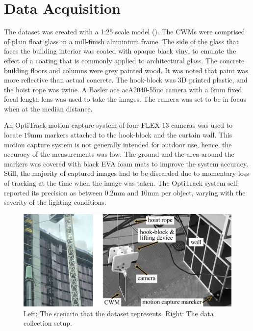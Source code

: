 \section*{Data Acquisition}
The dataset was created with a 1:25 scale model (). The CWMs were comprised of plain float glass in a mill-finish aluminium frame. The side of the glass that faces the building interior was coated with opaque black vinyl to emulate the effect of a coating that is commonly applied to architectural glass. The concrete building floors and columns were grey painted wood. It was noted that paint was more reflective than actual concrete. The hook-block was 3D printed plastic, and the hoist rope was twine. A Basler ace acA2040-55uc camera with a 6mm fixed focal length lens was used to take the images. The camera was set to be in focus when at the median distance.

An OptiTrack motion capture system of four FLEX 13 cameras was used to locate $19$mm markers attached to the hook-block and the curtain wall. This motion capture system is not generally intended for outdoor use, hence, the accuracy of the measurements was low. The ground and the area around the markers was covered with black EVA foam mats to improve the system accuracy. Still, the majority of captured images had to be discarded due to momentary loss of tracking at the time when the image was taken. The OptiTrack system self-reported its precision as between $0.2$mm and $10$mm per object, varying with the severity of the lighting conditions.

\begin{figure}[h]
	\centering
	\centerline{\includegraphics[width=1\columnwidth,keepaspectratio]{fig/ExperimentalSetupAndCW.pdf}}
	\caption{Left: The scenario that the dataset represents. Right: The data collection setup.}
    \label{fig:ExpAndCW}
\end{figure}

